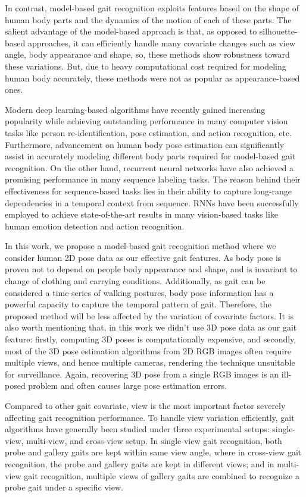 In contrast, model-based gait recognition exploits features based on the shape of human body parts and the dynamics of the motion of each of these parts. The salient advantage of the model-based approach is that, as  opposed to silhouette-based approaches, it can efficiently handle many covariate changes such as view angle, body appearance and shape, so, these methods show robustness toward these variations. But, due to heavy computational cost required for modeling human body accurately, these methods were not as popular as appearance-based ones. 

Modern deep learning-based algorithms have recently gained increasing popularity while achieving outstanding performance in many computer vision tasks like person re-identification, pose estimation, and action recognition, etc. Furthermore, advancement on human body pose estimation can significantly assist in accurately modeling different body parts required for model-based gait recognition. On the other hand, recurrent neural networks have also achieved a promising performance in many sequence labeling tasks. The reason behind their effectiveness for sequence-based tasks lies in their ability to capture long-range dependencies in a temporal context from sequence. RNNs have been successfully employed to achieve state-of-the-art results in many vision-based tasks like human emotion detection and action recognition.

In this work, we propose a model-based gait recognition method where we consider human 2D pose data as our effective gait features. As body pose is proven not to depend on people body appearance and shape, and is invariant to change of clothing and carrying conditions. Additionally, as gait can be considered a time series of walking postures, body pose information has a powerful capacity to capture the temporal pattern of gait. Therefore, the proposed method will be less affected by the variation of covariate factors. It is also worth mentioning that, in this work we didn't use 3D pose data as our gait feature: firstly, computing 3D poses is computationally expensive, and secondly, most of the 3D pose estimation algorithms from 2D RGB images often require multiple views, and hence multiple cameras, rendering the technique unsuitable for surveillance. Again, recovering 3D pose from a single RGB images is an ill-posed problem and often causes large pose estimation errors. 

Compared to other gait covariate, view is the most important factor severely affecting gait recognition performance. To handle view variation efficiently, gait algorithms have generally been studied under three experimental setups: single-view, multi-view, and cross-view setup. In single-view gait recognition, both probe and gallery gaits are kept within same view angle, where in cross-view gait recognition, the probe and gallery gaits are kept in different views; and in multi-view gait recognition, multiple views of gallery gaits are combined to recognize a probe gait under a specific view.

